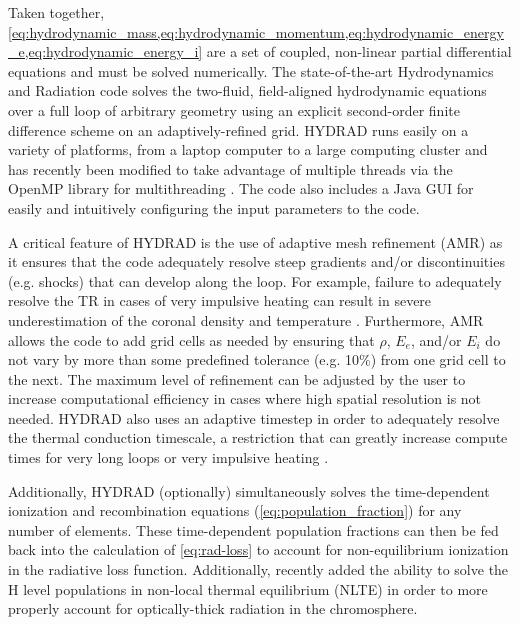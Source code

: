 Taken together, \cref{eq:hydrodynamic_mass,eq:hydrodynamic_momentum,eq:hydrodynamic_energy_e,eq:hydrodynamic_energy_i} are a set of coupled, non-linear partial differential equations and must be solved numerically. The state-of-the-art Hydrodynamics and Radiation code \citep[HYDRAD][]{bradshaw_radiative_2003,bradshaw_self-consistent_2003,bradshaw_influence_2013} solves the two-fluid, field-aligned hydrodynamic equations over a full loop of arbitrary geometry using an explicit second-order finite difference scheme on an adaptively-refined grid. HYDRAD runs easily on a variety of platforms, from a laptop computer to a large computing cluster and has recently been modified to take advantage of multiple threads via the OpenMP library for multithreading \citep{reep_efficient_2019}. The code also includes a Java GUI for easily and intuitively configuring the input parameters to the code. 

A critical feature of HYDRAD is the use of adaptive mesh refinement (AMR) as it ensures that the code adequately resolve steep gradients and/or discontinuities (e.g. shocks) that can develop along the loop. For example, failure to adequately resolve the TR in cases of very impulsive heating can result in severe underestimation of the coronal density and temperature \citep{bradshaw_influence_2013}. Furthermore, AMR allows the code to add grid cells as needed by ensuring that $\rho$, $E_e$, and/or $E_i$ do not vary by more than some predefined tolerance (e.g. 10\%) from one grid cell to the next. The maximum level of refinement can be adjusted by the user to increase computational efficiency in cases where high spatial resolution is not needed. HYDRAD also uses an adaptive timestep in order to adequately resolve the thermal conduction timescale, a restriction that can greatly increase compute times for very long loops or very impulsive heating \citep[though see a possible alternative in][]{johnston_new_2017}.

Additionally, HYDRAD (optionally) simultaneously solves the time-dependent ionization and recombination equations (\autoref{eq:population_fraction}) for any number of elements. These time-dependent population fractions can then be fed back into the calculation of \autoref{eq:rad-loss} to account for non-equilibrium ionization in the radiative loss function. Additionally, \citet{reep_efficient_2019} recently added the ability to solve the H level populations in non-local thermal equilibrium (NLTE) in order to more properly account for optically-thick radiation in the chromosphere. 

